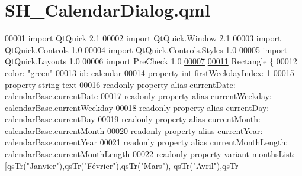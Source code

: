 \hypertarget{SH__CalendarDialog_8qml}{\section{S\-H\-\_\-\-Calendar\-Dialog.\-qml}
\label{SH__CalendarDialog_8qml}
}

\begin{DoxyCode}
00001 \textcolor{keyword}{import} QtQuick 2.1
00002 import QtQuick.Window 2.1
00003 import QtQuick.Controls 1.0
\hypertarget{SH__CalendarDialog_8qml_source_l00004}{}\hyperlink{classSH__CalendarDialog}{00004} import QtQuick.Controls.Styles 1.0
00005 import QtQuick.Layouts 1.0
00006 import PreCheck 1.0
\hypertarget{SH__CalendarDialog_8qml_source_l00007}{}\hyperlink{classSH__CalendarDialog_ada6f44b6f1a93ae9ef40b2fd3acdabd1}{00007} 
\hypertarget{SH__CalendarDialog_8qml_source_l00011}{}\hyperlink{classSH__CalendarDialog_a697b1e3c3faeee03197b575dd17cecdb}{00011} Rectangle \{
00012     color: \textcolor{stringliteral}{"green"}
\hypertarget{SH__CalendarDialog_8qml_source_l00013}{}\hyperlink{classSH__CalendarDialog_aa573e78a85228cbf2312b3bd7b776bbd}{00013}     \textcolor{keywordtype}{id}: calendar
00014     \textcolor{keyword}{property} \textcolor{keywordtype}{int} firstWeekdayIndex: 1
\hypertarget{SH__CalendarDialog_8qml_source_l00015}{}\hyperlink{classSH__CalendarDialog_a2c0ae47d55757e17551d5d6ea5413bb9}{00015}     \textcolor{keyword}{property} \textcolor{keywordtype}{string} text
00016     readonly \textcolor{keyword}{property} alias currentDate: calendarBase.currentDate
\hypertarget{SH__CalendarDialog_8qml_source_l00017}{}\hyperlink{classSH__CalendarDialog_a297eca7b6afa21350ff89a43580ff406}{00017}     readonly \textcolor{keyword}{property} alias currentWeekday: calendarBase.currentWeekday
00018     readonly \textcolor{keyword}{property} alias currentDay: calendarBase.currentDay
\hypertarget{SH__CalendarDialog_8qml_source_l00019}{}\hyperlink{classSH__CalendarDialog_a98760601bdd0a916ee33f4ed7ff185aa}{00019}     readonly \textcolor{keyword}{property} alias currentMonth: calendarBase.currentMonth
00020     readonly \textcolor{keyword}{property} alias currentYear: calendarBase.currentYear
\hypertarget{SH__CalendarDialog_8qml_source_l00021}{}\hyperlink{classSH__CalendarDialog_a9708f1f6b6cdcf136c533e206a29d98e}{00021}     readonly \textcolor{keyword}{property} alias currentMonthLength: calendarBase.currentMonthLength
00022     readonly \textcolor{keyword}{property} variant monthsList: [qsTr(\textcolor{stringliteral}{"Janvier"}),qsTr(\textcolor{stringliteral}{"Février"}),qsTr(\textcolor{stringliteral}{"Mars"}), qsTr(\textcolor{stringliteral}{"Avril"}),qsTr

\end{DoxyCode}
